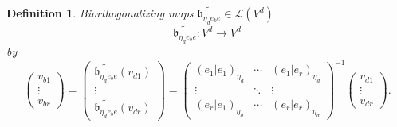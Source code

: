 \documentclass[aps,preprint]{revtex4}
\newtheorem{definition}[theorem]{Definition}
\begin{document}
\begin{definition}
Biorthogonalizing maps $\widetilde{\mathfrak{b}_{\eta _{d}e_{b}e}}\in 
\mathcal{L}\left( V^{d}\right) $ 
\begin{equation}
\widetilde{\mathfrak{b}_{\eta _{d}e_{b}e}}:V^{d}\rightarrow V^{d}
\end{equation}%
by%
\begin{equation}
\left( 
\begin{array}{c}
v_{b1} \\ 
\vdots \\ 
v_{br}%
\end{array}%
\right) =\left( 
\begin{array}{c}
\widetilde{\mathfrak{b}_{\eta _{d}e_{b}e}}\left( \overset{}{v_{d1}}\right)
\\ 
\vdots \\ 
\widetilde{\mathfrak{b}_{\eta _{d}e_{b}e}}\left( \overset{}{v_{dr}}\right)%
\end{array}%
\right) =\left( 
\begin{array}{ccc}
\left( \left. e_{1}\right\vert e_{1}\right) _{\eta _{d}} & \cdots & \left(
\left. e_{1}\right\vert e_{r}\right) _{\eta _{d}} \\ 
\vdots & \ddots & \vdots \\ 
\left( \left. e_{r}\right\vert e_{1}\right) _{\eta _{d}} & \cdots & \left(
\left. e_{r}\right\vert e_{r}\right) _{\eta _{d}}%
\end{array}%
\right) ^{-1}\left( 
\begin{array}{c}
v_{d1} \\ 
\vdots \\ 
v_{dr}%
\end{array}%
\right) .
\end{equation}
\end{definition}
\end{document}
